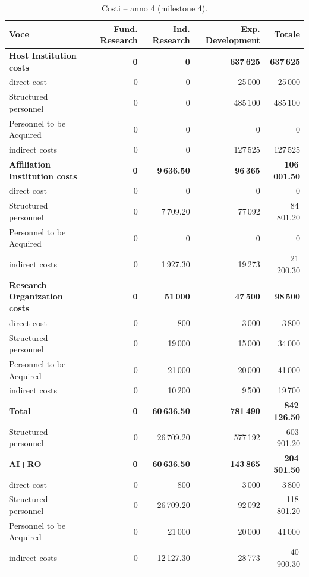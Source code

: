 \documentclass{plan4ari_report}
\begin{document}
\clearpage
\begin{table}[H]\centering\small
\caption{Costi -- anno 4 (milestone 4).}\label{tab:bpy-c-y4}
\begin{tabular}{lrrrr}\toprule
\textbf{Voce} & \textbf{Fund. Research} & \textbf{Ind. Research} & \textbf{Exp. Development} & \textbf{Totale} \\\midrule
\textbf{Host Institution costs} & \textbf{0} & \textbf{0} & \textbf{637\,625} & \textbf{637\,625} \\
\quad direct cost & 0 & 0 & 25\,000 & 25\,000 \\
\quad Structured personnel & 0 & 0 & 485\,100 & 485\,100 \\
\quad Personnel to be Acquired & 0 & 0 & 0 & 0 \\
\quad indirect costs & 0 & 0 & 127\,525 & 127\,525 \\
\textbf{Affiliation Institution costs} & \textbf{0} & \textbf{9\,636.50} & \textbf{96\,365} & \textbf{106\,001.50} \\
\quad direct cost & 0 & 0 & 0 & 0 \\
\quad Structured personnel & 0 & 7\,709.20 & 77\,092 & 84\,801.20 \\
\quad Personnel to be Acquired & 0 & 0 & 0 & 0 \\
\quad indirect costs & 0 & 1\,927.30 & 19\,273 & 21\,200.30 \\
\textbf{Research Organization costs} & \textbf{0} & \textbf{51\,000} & \textbf{47\,500} & \textbf{98\,500} \\
\quad direct cost & 0 & 800 & 3\,000 & 3\,800 \\
\quad Structured personnel & 0 & 19\,000 & 15\,000 & 34\,000 \\
\quad Personnel to be Acquired & 0 & 21\,000 & 20\,000 & 41\,000 \\
\quad indirect costs & 0 & 10\,200 & 9\,500 & 19\,700 \\
\midrule
\textbf{Total} & \textbf{0} & \textbf{60\,636.50} & \textbf{781\,490} & \textbf{842\,126.50} \\
\quad Structured personnel & 0 & 26\,709.20 & 577\,192 & 603\,901.20 \\
\textbf{AI+RO} & \textbf{0} & \textbf{60\,636.50} & \textbf{143\,865} & \textbf{204\,501.50} \\
\quad direct cost & 0 & 800 & 3\,000 & 3\,800 \\
\quad Structured personnel & 0 & 26\,709.20 & 92\,092 & 118\,801.20 \\
\quad Personnel to be Acquired & 0 & 21\,000 & 20\,000 & 41\,000 \\
\quad indirect costs & 0 & 12\,127.30 & 28\,773 & 40\,900.30 \\
\bottomrule\end{tabular}
\end{table}
\end{document}
